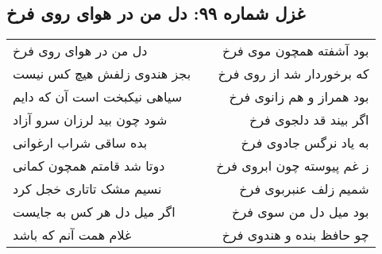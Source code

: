 \begin{center}
\section*{غزل شماره ۹۹: دل من در هوای روی فرخ}
\label{sec:sh099}
\begin{longtable}{l p{0.5cm} r}
دل من در هوای روی فرخ
&&
بود آشفته همچون موی فرخ
\\
بجز هندوی زلفش هیچ کس نیست
&&
که برخوردار شد از روی فرخ
\\
سیاهی نیکبخت است آن که دایم
&&
بود همراز و هم زانوی فرخ
\\
شود چون بید لرزان سرو آزاد
&&
اگر بیند قد دلجوی فرخ
\\
بده ساقی شراب ارغوانی
&&
به یاد نرگس جادوی فرخ
\\
دوتا شد قامتم همچون کمانی
&&
ز غم پیوسته چون ابروی فرخ
\\
نسیم مشک تاتاری خجل کرد
&&
شمیم زلف عنبربوی فرخ
\\
اگر میل دل هر کس به جایست
&&
بود میل دل من سوی فرخ
\\
غلام همت آنم که باشد
&&
چو حافظ بنده و هندوی فرخ
\\
\end{longtable}
\end{center}
